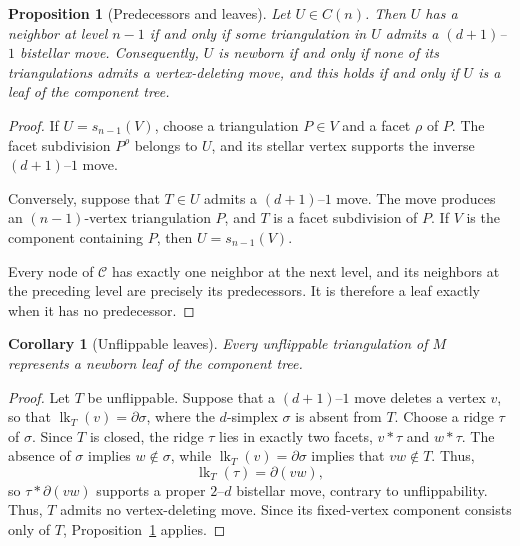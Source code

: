 \documentclass[11pt]{article}
\newtheorem{proposition}[theorem]{Proposition}
\newtheorem{corollary}[theorem]{Corollary}
\theoremstyle{remark}
\theoremstyle{plain}
\begin{document}
\begin{proposition}[Predecessors and leaves]
\label{prop:predecessors}
Let \(U\in C(n)\).  Then \(U\) has a neighbor at level \(n-1\) if and only
if some triangulation in \(U\) admits a \((d+1)\)--\(1\) bistellar move.
Consequently, \(U\) is newborn if and only if none of its triangulations
admits a vertex-deleting move, and this holds if and only if \(U\) is a leaf
of the component tree.
\end{proposition}

\begin{proof}
If \(U=s_{n-1}(V)\), choose a triangulation \(P\in V\) and a facet \(\rho\)
of \(P\).  The facet subdivision \(P^\rho\) belongs to \(U\), and its
stellar vertex supports the inverse \((d+1)\)--\(1\) move.

Conversely, suppose that \(T\in U\) admits a \((d+1)\)--\(1\) move.  The
move produces an \((n-1)\)-vertex triangulation \(P\), and \(T\) is a facet
subdivision of \(P\).  If \(V\) is the component containing \(P\), then
\(U=s_{n-1}(V)\).

Every node of \(\mathcal C\) has exactly one neighbor at the next level, and
its neighbors at the preceding level are precisely its predecessors.  It is
therefore a leaf exactly when it has no predecessor.
\end{proof}

\begin{corollary}[Unflippable leaves]
\label{cor:unflippable-leaves}
Every unflippable triangulation of \(M\) represents a newborn leaf of the
component tree.
\end{corollary}

\begin{proof}
Let \(T\) be unflippable.  Suppose that a \((d+1)\)--\(1\) move deletes a
vertex \(v\), so that \(\operatorname{lk}_T(v)=\partial\sigma\), where the
\(d\)-simplex \(\sigma\) is absent from \(T\).  Choose a ridge \(\tau\) of
\(\sigma\).  Since \(T\) is closed, the ridge \(\tau\) lies in exactly two
facets, \(v*\tau\) and \(w*\tau\).  The absence of \(\sigma\) implies
\(w\notin\sigma\), while \(\operatorname{lk}_T(v)=\partial\sigma\) implies
that \(vw\notin T\).  Thus,
\[
 \operatorname{lk}_T(\tau)=\partial(vw),
\]
so \(\tau*\partial(vw)\) supports a proper \(2\)--\(d\) bistellar move,
contrary to unflippability.  Thus, \(T\) admits no vertex-deleting move.
Since its fixed-vertex component consists only of \(T\),
Proposition~\ref{prop:predecessors} applies.
\end{proof}
\end{document}
